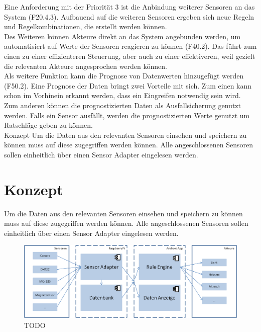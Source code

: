 Eine Anforderung mit der Priorität 3 ist die Anbindung weiterer Sensoren an das System (F20.4.3). Aufbauend auf die weiteren Sensoren ergeben sich neue Regeln und Regelkombinationen, die erstellt werden können.\\
Des Weiteren können Akteure direkt an das System angebunden werden, um automatisiert auf Werte der Sensoren reagieren zu können (F40.2). Das führt zum einen zu einer effizienteren Steuerung, aber auch zu einer effektiveren, weil gezielt die relevanten Akteure angesprochen werden können.\\
Als weitere Funktion kann die Prognose von Datenwerten hinzugefügt werden (F50.2). Eine Prognose der Daten bringt zwei Vorteile mit sich. Zum einen kann schon im Vorhinein erkannt werden, dass ein Eingreifen notwendig sein wird. Zum anderen können die prognostizierten Daten als Ausfallsicherung genutzt werden. Falls ein Sensor ausfällt, werden die prognostizierten Werte genutzt um Ratschläge geben zu können.\\
Konzept
Um die Daten aus den relevanten Sensoren einsehen und speichern zu können muss auf diese zugegriffen werden können. Alle angeschlossenen Sensoren sollen einheitlich über einen Sensor Adapter eingelesen werden.

\section{Konzept}
Um die Daten aus den relevanten Sensoren einsehen und speichern zu können muss auf diese zugegriffen werden können. Alle angeschlossenen Sensoren sollen einheitlich über einen Sensor Adapter eingelesen werden.
\begin{figure}
  \centering
    \includegraphics{images/Konzept_allgemein.png}
  \caption{TODO}
  \label{fig:M1}
\end{figure}